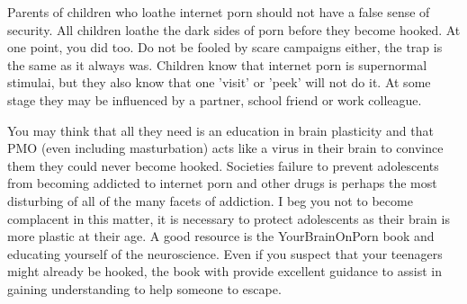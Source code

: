 Parents of children who loathe internet porn should not have a false sense of security. All children loathe the dark sides of porn before they become hooked. At one point, you did too. Do not be fooled by scare campaigns either, the trap is the same as it always was. Children know that internet porn is supernormal stimulai, but they also know that one 'visit' or 'peek' will not do it. At some stage they may be influenced by a partner, school friend or work colleague.

You may think that all they need is an education in brain plasticity and that PMO (even including masturbation) acts like a virus in their brain to convince them they could never become hooked. Societies failure to prevent adolescents from becoming addicted to internet porn and other drugs is perhaps the most disturbing of all of the many facets of addiction. I beg you not to become complacent in this matter, it is necessary to protect adolescents as their brain is more plastic at their age. A good resource is the YourBrainOnPorn book and educating yourself of the neuroscience. Even if you suspect that your teenagers might already be hooked, the book with provide excellent guidance to assist in gaining understanding to help someone to escape.

